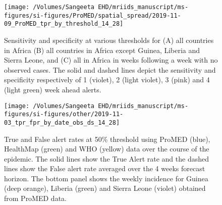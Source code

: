 \documentclass[9pt,twoside,lineno]{pnas-new}
\begin{document}
\begin{figure}
\centering
\texttt{[image: /Volumes/Sangeeta EHD/mriids\_manuscript/ms-figures/si-figures/ProMED/spatial\_spread/2019-11-09\_ProMED\_tpr\_by\_threshold\_14\_28]}
\caption{Sensitivity and specificity at various thresholds for (A) all
  countries in Africa (B) all
  countries in Africa except Guinea, Liberia and Sierra Leone, and (C) all
  in Africa in weeks following a week with no observed cases. The
  solid and dashed lines depict the sensitivity and specificity
  respectively of 1 (violet), 2 (light violet), 3 (pink) and 4
  (light green) week ahead alerts.}
\label{fig:tprbythreshold}
\end{figure}\FloatBarrier


\begin{figure}
\centering
\texttt{[image: /Volumes/Sangeeta EHD/mriids\_manuscript/ms-figures/si-figures/other/2019-11-03\_tpr\_fpr\_by\_date\_obs\_ds\_14\_28]}
\caption{True and False alert rates at 50\% threshold using ProMED
  (blue), HealthMap (green) and WHO (yellow) data 
  over the course of the epidemic. The solid lines show the True Alert
rate and the dashed lines show the False alert rate
averaged over the 4 weeks forecast horizon. The bottom panel shows the
weekly incidence for Guinea (deep orange), Liberia (green) and 
Sierra Leone (violet) obtained from ProMED data.}
\label{fig:tprovertime}
\end{figure}\FloatBarrier 
\end{document}
